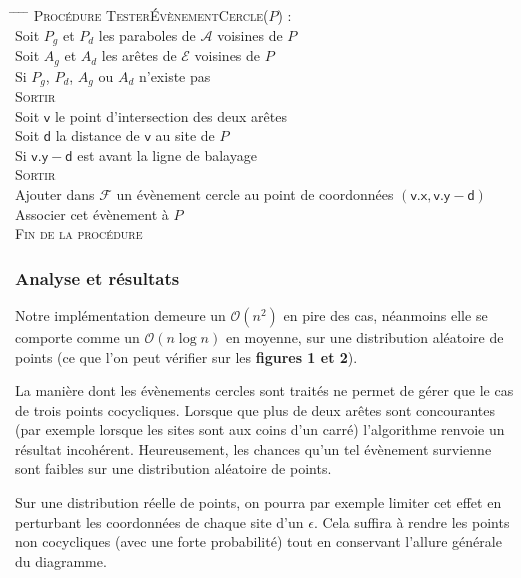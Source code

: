 \documentclass[a4paper, 10pt]{article}
\begin{document}
\begin{tabbing}
\hspace{0.5cm} \= \hspace{0.5cm} \= \hspace{0.5cm} \= \hspace{0.5cm} \= \kill
\textsc{Procédure TesterÉvènementCercle($P$) :} \\
\> Soit $P_g$ et $P_d$ les paraboles de $\mathcal{A}$ voisines de $P$ \\
\> Soit $A_g$ et $A_d$ les arêtes de $\mathcal{E}$ voisines de $P$ \\
\> Si $P_g$, $P_d$, $A_g$ ou $A_d$ n'existe pas \\ 
\> \> \textsc{Sortir} \\
\> Soit $\mathsf{v}$ le point d'intersection des deux arêtes \\
\> Soit $\mathsf{d}$ la distance de $\mathsf{v}$ au site de $P$ \\
\> Si $\mathsf{v.y-d}$ est avant la ligne de balayage \\
\> \> \textsc{Sortir} \\
\> Ajouter dans $\mathcal{F}$ un évènement cercle au point de coordonnées $\mathsf{(v.x, v.y-d)}$ \\  
\> Associer cet évènement à $P$ \\
\textsc{Fin de la procédure}
\end{tabbing}  
\subsubsection{Analyse et résultats}  
Notre implémentation demeure un $\mathcal{O}(n^2)$ en pire des cas, néanmoins elle se comporte comme un $\mathcal{O}(n\log{n})$ en moyenne, sur une distribution aléatoire de points (ce que l'on peut vérifier sur les \textbf{figures 1 et 2}).   
  
La manière dont les évènements cercles sont traités ne permet de gérer que le cas de trois points cocycliques. Lorsque que plus de deux arêtes sont concourantes (par exemple lorsque les sites sont aux coins d'un carré) l'algorithme renvoie un résultat incohérent. Heureusement, les chances qu'un tel évènement survienne sont faibles sur une distribution aléatoire de points.  
  
Sur une distribution réelle de points, on pourra par exemple limiter cet effet en perturbant les coordonnées de chaque site d'un $\epsilon$. Cela suffira à rendre les points non cocycliques (avec une forte probabilité) tout en conservant l'allure générale du diagramme.  
  
\end{document}
